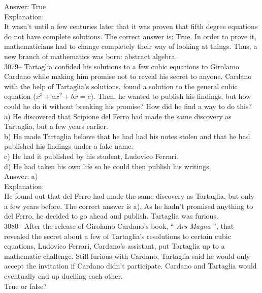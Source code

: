 \documentclass[letterpaper, 12pt]{article}
\begin{document}
Answer: True\\

Explanation:\\
It wasn't until a few centuries later that it was proven that fifth degree equations do not have complete solutions. The correct answer is: True. In order to prove it, mathematicians had to change completely their way of looking at things. Thus, a new branch of mathematics was born: abstract algebra.\\



3079-- Tartaglia confided his solutions to a few cubic equations to Girolamo Cardano while making him promise not to reveal his secret to anyone. Cardano with the help of Tartaglia's solutions, found a solution to the general cubic equation ($x^{3} + ax^{2} + bx =c$). Then, he wanted to publish his findings, but how could he do it without breaking his promise? How did he find a way to do this?\\

a) He discovered that Scipione del Ferro had made the same discovery as Tartaglia, but a few years earlier.\\
b) He made Tartaglia believe that he had had his notes stolen and that he had published his findings under a fake name.\\
c) He had it published by his student, Ludovico Ferrari.\\
d) He had taken his own life so he could then publish his writings.\\

Answer: a)\\

Explanation:\\
He found out that del Ferro had made the same discovery as Tartaglia, but only a few years before. The correct answer is a). As he hadn't promised anything to del Ferro, he decided to go ahead and publish. Tartaglia was furious.\\



3080-- After the release of Girolamo Cardano's book, `` \emph{Ars Magna} '', that revealed the secret about a few of Tartaglia's resolutions to certain cubic equations, Ludovico Ferrari, Cardano's assistant, put Tartaglia up to a mathematic challenge. Still furious with Cardano, Tartaglia said he would only accept the invitation if Cardano didn't participate. Cardano and Tartaglia would eventually end up duelling each other.\\
True or false?\\
\end{document}

